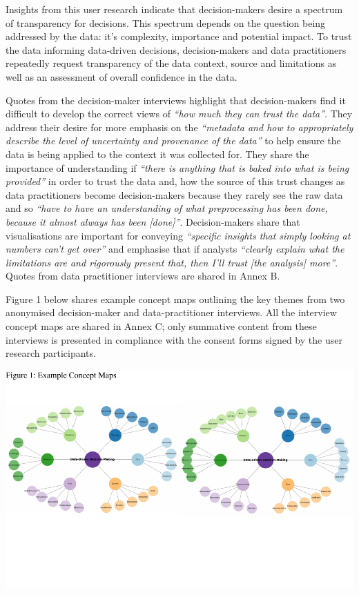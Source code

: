 \documentclass{article}
\begin{document}
Insights from this user research indicate that decision-makers desire a
spectrum of transparency for decisions. This spectrum depends on the
question being addressed by the data: it's complexity, importance and
potential impact. To trust the data informing data-driven decisions,
decision-makers and data practitioners repeatedly request transparency
of the data context, source and limitations as well as an assessment of
overall confidence in the data.

Quotes from the decision-maker interviews highlight that decision-makers
find it difficult to develop the correct views of \emph{``how much they
can trust the data''}. They address their desire for more emphasis on
the \emph{``metadata and how to appropriately describe the level of
uncertainty and provenance of the data''} to help ensure the data is
being applied to the context it was collected for. They share the
importance of understanding if \emph{``there is anything that is baked
into what is being provided''} in order to trust the data and, how the
source of this trust changes as data practitioners become
decision-makers because they rarely see the raw data and so \emph{``have
to have an understanding of what preprocessing has been done, because it
almost always has been {[}done{]}''}. Decision-makers share that
visualisations are important for conveying \emph{``specific insights
that simply looking at numbers can't get over''} and emphasise that if
analysts \emph{``clearly explain what the limitations are and rigorously
present that, then I'll trust {[}the analysis{]} more''}. Quotes from
data practitioner interviews are shared in Annex B.

Figure 1 below shares example concept maps outlining the key themes from
two anonymised decision-maker and data-practitioner interviews. All the
interview concept maps are shared in Annex C; only summative content
from these interviews is presented in compliance with the consent forms
signed by the user research participants.

\includegraphics{210431461_CSC8639_Dissertation_files/figure-latex/ConceptMapExample-1.pdf}
\vspace{-3.3cm}
\end{document}

